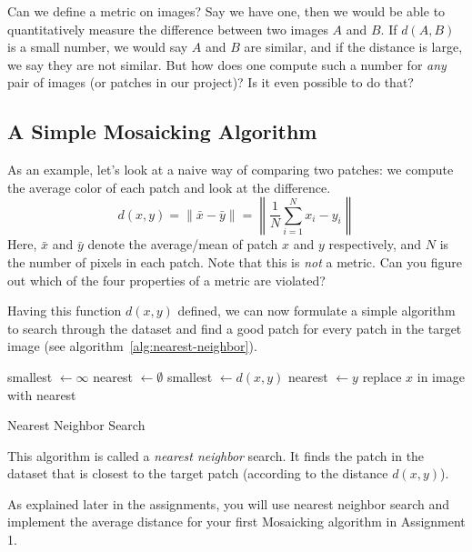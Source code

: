 \documentclass[a4paper]{article}
\begin{document}
		Can we define a metric on images? 
		Say we have one, then we would be able to quantitatively measure the difference between two images $A$ and $B$. 
		If $d(A, B)$ is a small number, we would say $A$ and $B$ are similar, and if the distance is large, we say they are not similar.
		But how does one compute such a number for \emph{any} pair of images (or patches in our project)?
		Is it even possible to do that?
		
	\subsection{A Simple Mosaicking Algorithm}\label{sec:simple-mosaicking}
		As an example, let's look at a naive way of comparing two patches: we compute the average color of each patch and look at the difference.
		\begin{equation}\label{eq:mean-color-distance}
			d(x, y) = \lVert \bar{x} - \bar{y} \rVert = \left\lVert \frac{1}{N} \sum_{i=1}^{N} x_i - y_i  \right\rVert
		\end{equation}
		Here, $\bar{x}$ and $\bar{y}$ denote the average/mean of patch $x$ and $y$ respectively, and $N$ is the number of pixels in each patch.
		Note that this is \emph{not} a metric. 
		Can you figure out which of the four properties of a metric are violated?
		
		Having this function $d(x, y)$ defined, we can now formulate a simple algorithm to search through the dataset and find a good patch for every patch in the target image (see algorithm~\ref{alg:nearest-neighbor}). 
		\begin{algorithm}[bt]
			\begin{algorithmic} 
					\STATE smallest $\leftarrow \infty$
					\STATE nearest $\leftarrow \emptyset$
						\STATE smallest $\leftarrow d(x, y)$
						\STATE nearest $\leftarrow y$
						\ENDIF
					\ENDFOR
					\STATE replace $x$ in image with nearest
				\ENDFOR
			\end{algorithmic}
			\caption{Nearest Neighbor Search}
			\label{alg:nearest-neighbor}
		\end{algorithm}
		This algorithm is called a \emph{nearest neighbor} search. 
		It finds the patch in the dataset that is closest to the target patch (according to the distance $d(x,y)$).
		
		As explained later in the assignments, you will use nearest neighbor search and implement the average distance for your first Mosaicking algorithm in Assignment 1.
		
\end{document}
